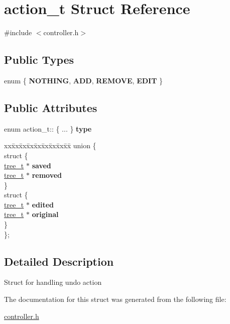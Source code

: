 \hypertarget{structaction__t}{}\section{action\+\_\+t Struct Reference}
\label{structaction__t}


{\ttfamily \#include $<$controller.\+h$>$}

\subsection*{Public Types}
\begin{DoxyCompactItemize}
\item 
\hypertarget{structaction__t_a6f86f0e040e87e9561bfcf5bac15b5ee}{}enum \{ {\bfseries N\+O\+T\+H\+I\+N\+G}, 
{\bfseries A\+D\+D}, 
{\bfseries R\+E\+M\+O\+V\+E}, 
{\bfseries E\+D\+I\+T}
 \}\label{structaction__t_a6f86f0e040e87e9561bfcf5bac15b5ee}

\end{DoxyCompactItemize}
\subsection*{Public Attributes}
\begin{DoxyCompactItemize}
\item 
\hypertarget{structaction__t_a92c75ec699688c635abc60f5e23d9562}{}enum action\+\_\+t\+:: \{ ... \}  {\bfseries type}\label{structaction__t_a92c75ec699688c635abc60f5e23d9562}

\item 
\hypertarget{structaction__t_aab21e78c18523afe5b17c273e42880b7}{}\begin{tabbing}
xx\=xx\=xx\=xx\=xx\=xx\=xx\=xx\=xx\=\kill
union \{\\
\hypertarget{unionaction__t_1_1_0D1_af4d44e4f2193bd19755cb96331e6429e}{}\>struct \{\\
\>\>\hyperlink{structtree}{tree\_t} $\ast$ {\bfseries saved}\\
\>\>\hyperlink{structtree}{tree\_t} $\ast$ {\bfseries removed}\\
\>\} \label{unionaction__t_1_1_0D1_af4d44e4f2193bd19755cb96331e6429e}
\\
\hypertarget{unionaction__t_1_1_0D1_a81cebf1823b5658bc23049c5431e58ec}{}\>struct \{\\
\>\>\hyperlink{structtree}{tree\_t} $\ast$ {\bfseries edited}\\
\>\>\hyperlink{structtree}{tree\_t} $\ast$ {\bfseries original}\\
\>\} \label{unionaction__t_1_1_0D1_a81cebf1823b5658bc23049c5431e58ec}
\\
\}; \label{structaction__t_aab21e78c18523afe5b17c273e42880b7}
\\

\end{tabbing}\end{DoxyCompactItemize}


\subsection{Detailed Description}
Struct for handling undo action 

The documentation for this struct was generated from the following file\+:\begin{DoxyCompactItemize}
\item 
\hyperlink{controller_8h}{controller.\+h}\end{DoxyCompactItemize}
